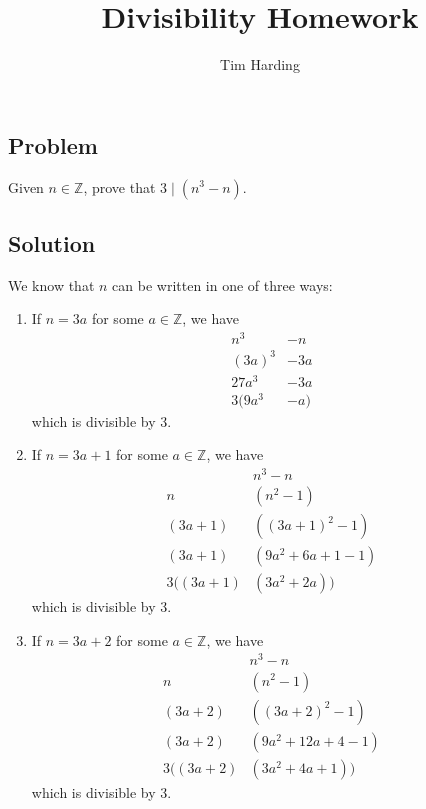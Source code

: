 \documentclass[12pt]{article}
\title{Divisibility Homework}
\author{Tim Harding}
\newcommand{\Z}    [0]{\mathbb{Z}                   }
\begin{document}
\maketitle

\section{}

\subsection{Problem}
Given $n \in \mathbb{Z}$, prove that $3 \mid (n^3 - n)$.

\subsection{Solution}
We know that $n$ can be written in one of three ways:
\begin{enumerate}
    \item If $n = 3a$ for some $a \in \Z$, we have \begin{align*}
        n^3 &- n \\
        (3a)^3 &- 3a \\
        27a^3 &- 3a \\
        3(9a^3 &- a)
    \end{align*} which is divisible by 3.

    \item If $n = 3a + 1$ for some $a \in \Z$, we have \begin{align*}
        &n^3 - n \\
        n&(n^2 - 1) \\
        (3a + 1) &((3a + 1)^2 - 1) \\
        (3a + 1) &(9a^2 + 6a + 1 - 1) \\
        3 ((3a + 1)&(3a^2 + 2a))
    \end{align*} which is divisible by 3.

    \item If $n = 3a + 2$ for some $a \in \Z$, we have \begin{align*}
        &n^3 - n \\
        n&(n^2 - 1) \\
        (3a + 2) &((3a + 2)^2 - 1) \\
        (3a + 2) &(9a^2 + 12a + 4 - 1) \\
        3 ((3a + 2) &(3a^2 + 4a + 1))
    \end{align*} which is divisible by 3.
\end{enumerate}
\end{document}
